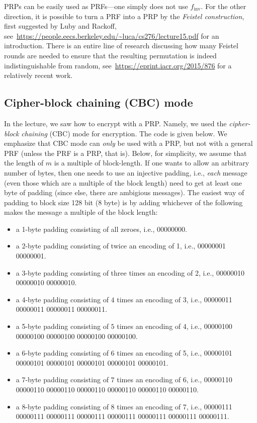 \documentclass[a4paper,table,dvipsnames]{article}
\theoremstyle{definition}
\begin{document}
PRPs can be easily used as PRFs---one simply does not use $f_{\text{inv}}$. For the other
direction, it is possible to turn a PRF into a PRP by the \emph{Feistel construction},
first suggested by Luby and Rackoff, see~\url{https://people.eecs.berkeley.edu/~luca/cs276/lecture15.pdf}
for an introduction. There is an entire line of research discussing how many Feistel rounds are needed
to ensure that the resulting permutation is indeed indistinguishable from random, see~\url{https://eprint.iacr.org/2015/876}
for a relatively recent work.

\subsection{Cipher-block chaining (CBC) mode}
In the lecture, we saw how to encrypt with a PRP. Namely, we used the \emph{cipher-block chaining}
(CBC) mode for encryption. The code is given below. We emphasize that CBC mode can \emph{only} be
used with a PRP, but not with a general PRF (unless the PRF is a PRP, that is). Below, for simplicity,
we assume that the length of $m$ is a multiple of block-length. If one wants to allow an arbitrary number
of bytes, then one needs to use an injective padding, i.e., \emph{each} message (even those which are
a multiple of the block length) need to get at least one byte of padding (since else, there are ambigious
messages). The easiest way of padding
to block size 128 bit (8 byte) is by adding whichever of the following makes the message a multiple of
the block length:
\begin{itemize}
\item a 1-byte padding consisting of all zeroes, i.e., 00000000.
\item a 2-byte padding consisting of twice an encoding of 1, i.e., 00000001 00000001.
\item a 3-byte padding consisting of three times an encoding of 2, i.e., 00000010 00000010 00000010.
\item a 4-byte padding consisting of $4$ times an encoding of 3, i.e., 00000011 00000011 00000011 00000011.
\item a 5-byte padding consisting of $5$ times an encoding of 4, i.e., 00000100 00000100 00000100 00000100 00000100.
\item a 6-byte padding consisting of $6$ times an encoding of 5, i.e., 00000101 00000101 00000101 00000101 00000101 00000101.
\item a 7-byte padding consisting of $7$ times an encoding of 6, i.e., 00000110 00000110 00000110 00000110 00000110 00000110 00000110.
\item a 8-byte padding consisting of $8$ times an encoding of 7, i.e., 00000111 00000111 00000111 00000111 00000111 00000111 00000111 00000111.
\end{itemize}
\end{document}
